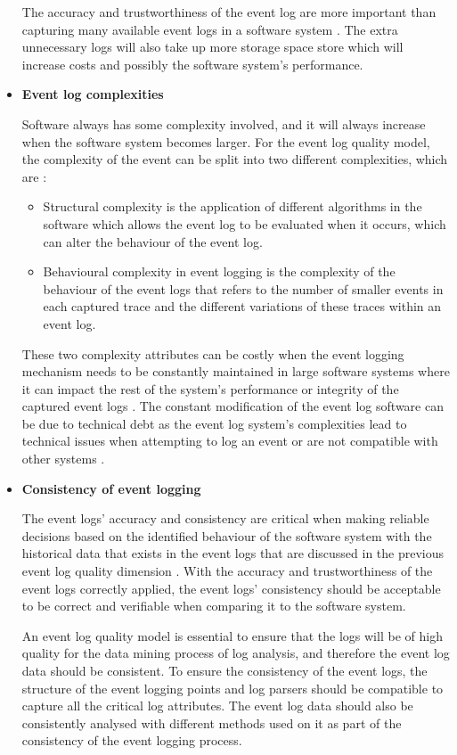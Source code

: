 \begin{itemize}
	The accuracy and trustworthiness of the event log are more important than capturing many available event logs in a software system \cite{Zhu2015, Jans2012}. The extra unnecessary logs will also take up more storage space store which will increase costs and possibly the software system's performance. 

	\item \textbf{Event log complexities}\par Software always has some complexity involved, and it will always increase when the software system becomes larger. For the event log quality model, the complexity of the event can be split into two different complexities, which are \cite{Kherbouche2017}:

	\begin{itemize}
		\item Structural complexity is the application of different algorithms in the software which allows the event log to be evaluated when it occurs, which can alter the behaviour of the event log.
		\item Behavioural complexity in event logging is the complexity of the behaviour of the event logs that refers to the number of smaller events in each captured trace and the different variations of these traces within an event log.
	\end{itemize}

	These two complexity attributes can be costly when the event logging mechanism needs to be constantly maintained in large software systems where it can impact the rest of the system's performance or integrity of the captured event logs \cite{Ogheneovo2014}. The constant modification of the event log software can be due to technical debt as the event log system's complexities lead to technical issues when attempting to log an event or are not compatible with other systems \cite{DeLeon-Sigg2020}.  

 	\item \textbf{Consistency of event logging}\par The event logs' accuracy and consistency are critical when making reliable decisions based on the identified behaviour of the software system with the historical data that exists in the event logs that are discussed in the previous event log quality dimension \cite{Stojanov2017, Kherbouche2017}. With the accuracy and trustworthiness of the event logs correctly applied, the event logs' consistency should be acceptable to be correct and verifiable when comparing it to the software system. \par An event log quality model is essential to ensure that the logs will be of high quality for the data mining process of log analysis, and therefore the event log data should be consistent. To ensure the consistency of the event logs, the structure of the event logging points and log parsers should be compatible to capture all the critical log attributes. The event log data should also be consistently analysed with different methods used on it as part of the consistency of the event logging process.


\end{itemize}
